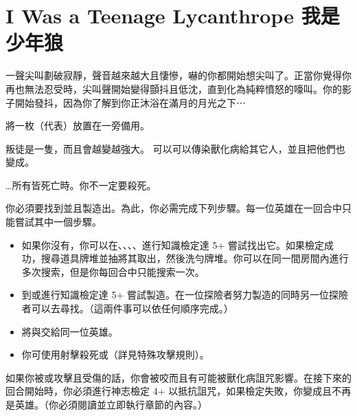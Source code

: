
\chapter{I Was a Teenage Lycanthrope 我是少年狼}

\begin{HauntStory}
  一聲尖叫劃破寂靜，聲音越來越大且悽慘，嚇的你都開始想尖叫了。正當你覺得你再也無法忍受時，尖叫聲開始變得顫抖且低沈，直到化為純粹憤怒的嚎叫。你的影子開始發抖，因為你了解到你正沐浴在滿月的月光之下⋯
\end{HauntStory}

將一枚（代表）放置在一旁備用。


叛徒是一隻，而且會越變越強大。
可以可以傳染獸化病給其它人，並且把他們也變成。

…所有皆死亡時。你不一定要殺死。

你必須要找到並且製造出。為此，你必需完成下列步驟。每一位英雄在一回合中只能嘗試其中一個步驟。
\begin{itemize}
  \item 如果你沒有，你可以在、、、、進行知識檢定達 5+ 嘗試找出它。如果檢定成功，搜尋道具牌堆並抽將其取出，然後洗勻牌堆。你可以在同一間房間內進行多次搜索，但是你每回合中只能搜索一次。
  \item 到或進行知識檢定達 5+ 嘗試製造。在一位探險者努力製造的同時另一位探險者可以去尋找。（這兩件事可以依任何順序完成。）
  \item 將與交給同一位英雄。
  \item 你可使用射擊殺死或（詳見特殊攻擊規則）。
\end{itemize}

\vfill\null\pagebreak

如果你被或攻擊且受傷的話，你會被咬而且有可能被獸化病詛咒影響。在接下來的回合開始時，你必須進行神志檢定 4+ 以抵抗詛咒，如果檢定失敗，你變成且不再是英雄。（你必須閱讀並立即執行章節的內容。）

